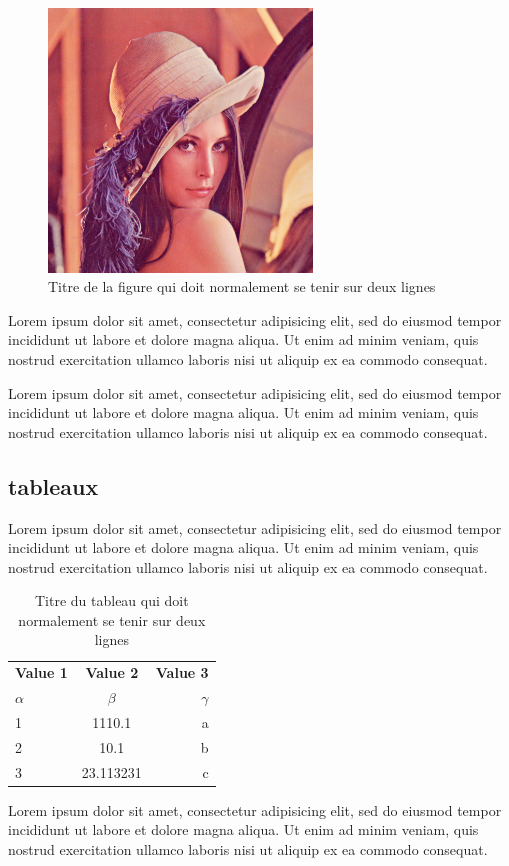 \begin{figure}[H]
 \centering
 \includegraphics[width=7cm]{lenna.png}
 \caption{Titre de la figure qui doit normalement se tenir sur deux lignes}
 \label{fig:figure1}
\end{figure}

Lorem ipsum dolor sit amet, consectetur adipisicing elit, sed do eiusmod
tempor incididunt ut labore et dolore magna aliqua. Ut enim ad minim veniam,
quis nostrud exercitation ullamco laboris nisi ut aliquip ex ea commodo
consequat.

Lorem ipsum dolor sit amet, consectetur adipisicing elit, sed do eiusmod
tempor incididunt ut labore et dolore magna aliqua. Ut enim ad minim veniam,
quis nostrud exercitation ullamco laboris nisi ut aliquip ex ea commodo
consequat.

\subsection{tableaux}   

Lorem ipsum dolor sit amet, consectetur adipisicing elit, sed do eiusmod
tempor incididunt ut labore et dolore magna aliqua. Ut enim ad minim veniam,
quis nostrud exercitation ullamco laboris nisi ut aliquip ex ea commodo
consequat.

\begin{table}[H]
  \begin{center}
    \caption{Titre du tableau qui doit normalement se tenir sur deux lignes}
    \label{tab:table1}
    \begin{tabular}{l|c|r}
      \textbf{Value 1} & \textbf{Value 2} & \textbf{Value 3}\\
      $\alpha$ & $\beta$ & $\gamma$ \\
      \hline
      1 & 1110.1 & a\\
      2 & 10.1 & b\\
      3 & 23.113231 & c\\
    \end{tabular}
  \end{center}
\end{table}

Lorem ipsum dolor sit amet, consectetur adipisicing elit, sed do eiusmod
tempor incididunt ut labore et dolore magna aliqua. Ut enim ad minim veniam,
quis nostrud exercitation ullamco laboris nisi ut aliquip ex ea commodo
consequat.